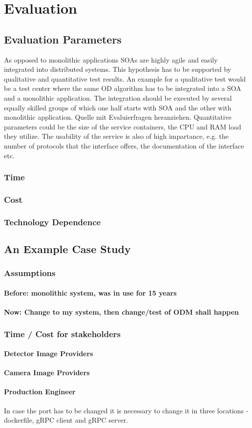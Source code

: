\chapter{Evaluation\label{cha:chapter6}}
\section{Evaluation Parameters}
As opposed to monolithic applications SOAs are highly agile and easily integrated into distributed systems. This hypothesis has to be supported by qualitative and quantitative test results. An example for a qualitative test would be a test center where the same OD algorithm has to be integrated into a SOA and a monolithic application. The integration should be executed by several equally skilled groups of which one half starts with SOA and the other with monolithic application. 
Quelle mit Evaluierfragen heranziehen.
Quantitative parameters could be the size of the service containers, the CPU and RAM load they utilize. The usability of the service is also of high impartance, e.g. the number of protocols that the interface offers, the documentation of the interface etc. 
		\subsection{Time}
		\subsection{Cost}
		\subsection{Technology Dependence}
\section{An Example Case Study}
		\subsection{Assumptions}
			\subsubsection{Before: monolithic system, was in use for 15 years}
			\subsubsection{Now: Change to my system, then change/test of ODM shall happen}
		\subsection{Time / Cost for stakeholders}
			\subsubsection{Detector Image Providers}
			\subsubsection{Camera Image Providers}
            \subsubsection{Production Engineer}
            In case the port has to be changed it is necessary to change it in three locations - dockerfile, gRPC client and gRPC server. 